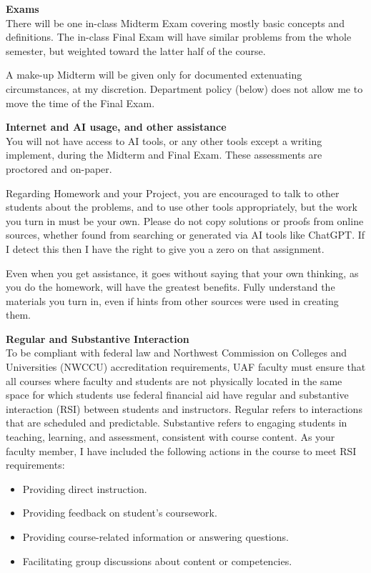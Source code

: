 \documentclass[12pt]{article}
\renewcommand{\emph}[1]{\textsf{\textbf{#1}}}
\newcommand{\localhead}[1]{\par\smallskip\textbf{#1} \smallskip\nobreak\\}%
\def\heading#1{\localhead{\large\emph{#1}}}
\def\subheading#1{\localhead{\emph{#1}}}
\begin{document}
\heading{Exams}
There will be one in-class Midterm Exam covering mostly basic concepts and definitions. The in-class Final Exam will have similar problems from the whole semester, but weighted toward the latter half of the course.

A make-up Midterm will be given only for documented extenuating circumstances, at my discretion.  Department policy (below) does not allow me to move the time of the Final Exam.

\subheading{Internet and AI usage, and other assistance}
You will not have access to AI tools, or any other tools except a writing implement, during the Midterm and Final Exam.  These assessments are proctored and on-paper.

Regarding Homework and your Project, you are encouraged to talk to other students about the problems, and to use other tools appropriately, but the work you turn in must be your own.  Please do not copy solutions or proofs from online sources, whether found from searching or generated via AI tools like ChatGPT.   If I detect this then I have the right to give you a zero on that assignment.

Even when you get assistance, it goes without saying that your own thinking, as you do the homework, will have the greatest benefits.  Fully understand the materials you turn in, even if hints from other sources were used in creating them.

\subheading{Regular and Substantive Interaction}
To be compliant with federal law and Northwest Commission on Colleges and Universities (NWCCU) accreditation requirements, UAF faculty must ensure that all courses where faculty and students are not physically located in the same space for which students use federal financial aid have regular and substantive interaction (RSI) between students and instructors. Regular refers to interactions that are scheduled and predictable. Substantive refers to engaging students in teaching, learning, and assessment, consistent with course content. As your faculty member, I have included the following actions in the course to meet RSI requirements:
\begin{itemize}
\item Providing direct instruction.
\item Providing feedback on student’s coursework.
\item Providing course-related information or answering questions.
\item Facilitating group discussions about content or competencies.
\end{itemize}
\end{document}
